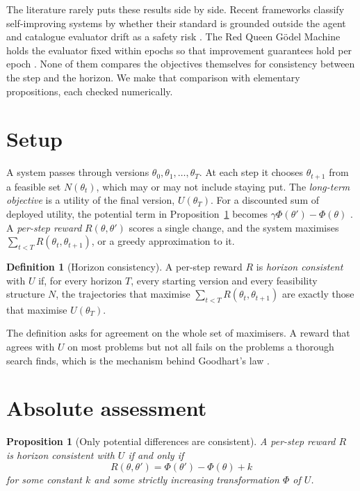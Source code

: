 \documentclass[11pt]{article}
\newtheorem{proposition}{Proposition}
\theoremstyle{definition}
\newtheorem{definition}{Definition}
\theoremstyle{remark}
\begin{document}
The literature rarely puts these results side by side. Recent frameworks classify self-improving systems
by whether their standard is grounded outside the agent \citep{tang2026gai} and catalogue
evaluator drift as a safety risk \citep{gong2026evolutionary}. The Red Queen G\"odel Machine
holds the evaluator fixed within epochs so that improvement guarantees hold per epoch
\citep{iacob2026redqueen}. None of them compares the objectives themselves for consistency
between the step and the horizon. We make that comparison with elementary propositions, each
checked numerically.

\section{Setup}

A system passes through versions $\theta_0,\theta_1,\dots,\theta_T$. At each step it chooses
$\theta_{t+1}$ from a feasible set $N(\theta_t)$, which may or may not include staying put. The \emph{long-term
objective} is a utility of the final version, $U(\theta_T)$. For a discounted sum of deployed
utility, the potential term in Proposition~\ref{prop:potential} becomes
$\gamma\Phi(\theta')-\Phi(\theta)$ \citep{ng1999shaping}. A \emph{per-step reward}
$R(\theta,\theta')$ scores a single change, and the system maximises
$\sum_{t<T} R(\theta_t,\theta_{t+1})$, or a greedy approximation to it.

\begin{definition}[Horizon consistency]
A per-step reward $R$ is \emph{horizon consistent} with $U$ if, for every horizon $T$, every
starting version and every feasibility structure $N$, the trajectories that maximise
$\sum_{t<T}R(\theta_t,\theta_{t+1})$ are exactly those that maximise $U(\theta_T)$.
\end{definition}

The definition asks for agreement on the whole set of maximisers. A reward that agrees with $U$
on most problems but not all fails on the problems a thorough search finds, which is the
mechanism behind Goodhart's law \citep{manheim2018goodhart}.

\section{Absolute assessment}

\begin{proposition}[Only potential differences are consistent]\label{prop:potential}
A per-step reward $R$ is horizon consistent with $U$ if and only if
\[
R(\theta,\theta') = \Phi(\theta') - \Phi(\theta) + k
\]
for some constant $k$ and some strictly increasing transformation $\Phi$ of $U$.
\end{proposition}
\end{document}
